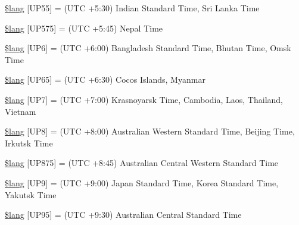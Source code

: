 \begin{DoxyCompactItemize}
\item 
\hyperlink{_admin_2system_2language_2english_2date__lang_8php_aa55a1ebecdfbd5e0c7e40c921b90cad2}{\$lang} \mbox{[}\textquotesingle{}U\+P55\textquotesingle{}\mbox{]} = \textquotesingle{}(U\+T\+C +5\+:30) Indian Standard Time, Sri Lanka Time\textquotesingle{}
\item 
\hyperlink{_admin_2system_2language_2english_2date__lang_8php_abc4186fc3bc853aa036b5b11eeb52ecd}{\$lang} \mbox{[}\textquotesingle{}U\+P575\textquotesingle{}\mbox{]} = \textquotesingle{}(U\+T\+C +5\+:45) Nepal Time\textquotesingle{}
\item 
\hyperlink{_admin_2system_2language_2english_2date__lang_8php_aaa655de76a3be875d9cedbf4a57244fa}{\$lang} \mbox{[}\textquotesingle{}U\+P6\textquotesingle{}\mbox{]} = \textquotesingle{}(U\+T\+C +6\+:00) Bangladesh Standard Time, Bhutan Time, Omsk Time\textquotesingle{}
\item 
\hyperlink{_admin_2system_2language_2english_2date__lang_8php_af94f885b6e6c50abdf7672ddfa80774d}{\$lang} \mbox{[}\textquotesingle{}U\+P65\textquotesingle{}\mbox{]} = \textquotesingle{}(U\+T\+C +6\+:30) Cocos Islands, Myanmar\textquotesingle{}
\item 
\hyperlink{_admin_2system_2language_2english_2date__lang_8php_aeedffaf1d3a16a41e881d85c420482ce}{\$lang} \mbox{[}\textquotesingle{}U\+P7\textquotesingle{}\mbox{]} = \textquotesingle{}(U\+T\+C +7\+:00) Krasnoyarsk Time, Cambodia, Laos, Thailand, Vietnam\textquotesingle{}
\item 
\hyperlink{_admin_2system_2language_2english_2date__lang_8php_a2a828a680158ca4cfb7fba60f35c67a3}{\$lang} \mbox{[}\textquotesingle{}U\+P8\textquotesingle{}\mbox{]} = \textquotesingle{}(U\+T\+C +8\+:00) Australian Western Standard Time, Beijing Time, Irkutsk Time\textquotesingle{}
\item 
\hyperlink{_admin_2system_2language_2english_2date__lang_8php_a486696d3d41c5d263a8b550903052ecb}{\$lang} \mbox{[}\textquotesingle{}U\+P875\textquotesingle{}\mbox{]} = \textquotesingle{}(U\+T\+C +8\+:45) Australian Central Western Standard Time\textquotesingle{}
\item 
\hyperlink{_admin_2system_2language_2english_2date__lang_8php_aa112bfd057369e5adb437c55457c9f79}{\$lang} \mbox{[}\textquotesingle{}U\+P9\textquotesingle{}\mbox{]} = \textquotesingle{}(U\+T\+C +9\+:00) Japan Standard Time, Korea Standard Time, Yakutsk Time\textquotesingle{}
\item 
\hyperlink{_admin_2system_2language_2english_2date__lang_8php_a96965669ac4830ab024b39a4ebb763f1}{\$lang} \mbox{[}\textquotesingle{}U\+P95\textquotesingle{}\mbox{]} = \textquotesingle{}(U\+T\+C +9\+:30) Australian Central Standard Time\textquotesingle{}

\end{DoxyCompactItemize}

